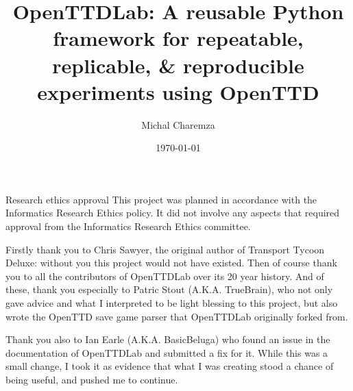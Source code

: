 \documentclass[logo,msc,dsti]{style/infthesis}    %
\begin{document}
\begin{preliminary}

\title{OpenTTDLab: A reusable Python framework for repeatable, replicable, \& reproducible experiments using OpenTTD}

\author{Michal Charemza}

\date{\today}


\maketitle

\newenvironment{ethics}
   {\begin{frontenv}{Research ethics approval}{\LARGE}}
   {\end{frontenv}\newpage}

\begin{ethics}
This project was planned in accordance with the Informatics Research
Ethics policy. It did not involve any aspects that required approval
from the Informatics Research Ethics committee.
\standarddeclaration
\end{ethics}

\begin{acknowledgements}

Firstly thank you to Chris Sawyer, the original author of Transport Tycoon Deluxe: without you this project would not have existed. Then of course thank you to all the contributors of OpenTTDLab over its 20 year history. And of these, thank you especially to Patric Stout (A.K.A. TrueBrain), who not only gave advice and what I interpreted to be light blessing to this project, but also wrote the OpenTTD save game parser that OpenTTDLab originally forked from.

Thank you also to Ian Earle (A.K.A. BasicBeluga) who found an issue in the documentation of OpenTTDLab and submitted a fix for it. While this was a small change, I took it as evidence that what I was creating stood a chance of being useful, and pushed me to continue.


\end{acknowledgements}
\end{preliminary}
\end{document}
